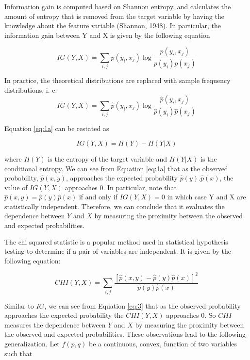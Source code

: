 \documentclass[review]{elsarticle}
\begin{document}
Information gain is computed based on Shannon entropy, and calculates the amount of entropy that is removed from the target variable by having the knowledge about the feature variable (Shannon, 1948). In particular, the information gain between Y and X  is given by the following equation

\begin{equation}\label{eq:1a}
IG(Y,X)=\sum_{i,j} p(y_{i}, x_{j}) \log \frac{  p(y_{i}, x_{j})}{ p(y_{i})  p(x_{j} )}
\end{equation}

In practice, the theoretical distributions are replaced with sample frequency distributions, i. e. 
\[ IG(Y,X)=\sum_{i,j} \hat{p}(y_{i}, x_{j}) \log \frac{  \hat{p}(y_{i}, x_{j})}{ \hat{p}(y_{i})  \hat{p}(x_{j} )} \]


Equation \ref{eq:1a} can be restated as 

\begin{equation}\label{eq:2}
IG(Y,X)=H(Y)-H(Y|X)
\end{equation}

where $ H(Y) $ is the entropy of the target variable and  $ H(Y|X) $ is the conditional entropy. We can see from Equation \ref{eq:1a} that as the observed probability, $ \hat{p}(x,y) $, approaches the expected probability $ \hat{p}(y).\hat{p}(x) $, the value of $ IG(Y,X) $ approaches $ 0 $. In particular, note that $ \hat{p}(x,y) = \hat{p}(y)\hat{p}(x) $  if and only if $ IG(Y,X)=0 $ in which case Y and X are statistically independent. Therefore, we can conclude that it evaluates the dependence between $ Y $ and $ X $ by measuring the proximity between the observed and expected probabilities.


The chi squared statistic is a popular method used in statistical hypothesis testing to determine if a pair of variables are independent. It is given by the following equation:

\begin{equation}\label{eq:3}
CHI(Y,X)= \sum_{i,j} \frac{[\hat{p}(x,y) - \hat{p}(y)\hat{p}(x)]^2}{\hat{p}(y)\hat{p}(x)}
\end{equation}

Similar to $ IG $, we can see from Equation \ref{eq:3} that as the observed probability approaches the expected probability the $ CHI(Y,X) $ approaches 0. So $ CHI $ measures the dependence between $ Y $ and $ X $ by measuring the proximity between the observed and expected probabilities. These observations lead to the following generalization. Let $ f(p,q) $  be a continuous, convex, function of two variables such that  
\end{document}
